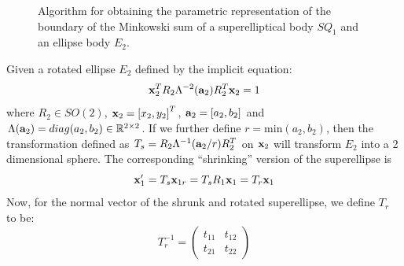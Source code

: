 \documentclass[]{article}
\begin{document}
\begin{figure}[!t]
	\hspace{0.1in}
	\caption{Algorithm for obtaining the parametric representation of the boundary of the Minkowski sum of a superelliptical body $SQ_1$ and an ellipse body $E_2$.}
	\label{fig:M-sum}
\end{figure}

Given a rotated ellipse $E_2$ defined by the implicit equation:
\begin{equation}
{\bf x}_2^{T}R_2\Lambda^{-2}({\bf a}_2)R_2^{T}{\bf x}_2 = 1
\end{equation}
where $R_2 \in SO(2)$, ${\bf x}_2 = \left[x_2, y_2\right]^T$, ${\bf a}_2 = \left[a_2, b_2\right]$ and $\Lambda({\bf a}_2) = diag(a_2, b_2) \in \mathbb{R}^{2 \times 2}$. If we further define $r = \text{min}(a_2, b_2)$, then the transformation defined as $T_s = R_2\Lambda^{-1}({\bf a}_2/r)R_2^{T}$ on ${\bf x}_2$ will transform $E_2$ into a 2 dimensional sphere.
The corresponding ``shrinking'' version of the superellipse is
\begin{equation}
{\bf x}_1^{\prime}  = T_s {\bf x}_{1r} = T_s R_1{\bf x}_{1} = T_r {\bf x}_{1}
\label{shrinkrotsq}
\end{equation}
Now, for the normal vector of the shrunk and rotated superellipse, we define $T_r$ to be:
\begin{equation}
T_r^{-1} =
\left(
\begin{array}{lr}
t_{11} & t_{12} \\
t_{21} & t_{22}
\end{array}
\right)
\end{equation}
\end{document}

